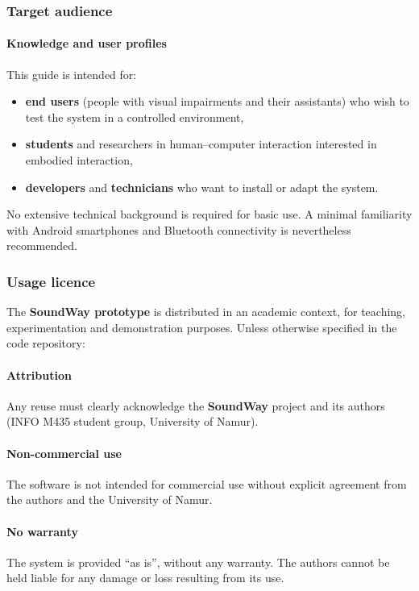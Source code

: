 \documentclass[12pt,a4paper]{article}
\begin{document}
\subsubsection{Target audience}

\paragraph{Knowledge and user profiles}

This guide is intended for:
\begin{itemize}
    \item \textbf{end users} (people with visual impairments and their assistants) who wish to test the system in a controlled environment,
    \item \textbf{students} and researchers in human–computer interaction interested in embodied interaction,
    \item \textbf{developers} and \textbf{technicians} who want to install or adapt the system.
\end{itemize}

No extensive technical background is required for basic use. A minimal familiarity with Android smartphones and Bluetooth connectivity is nevertheless recommended.

\subsubsection{Usage licence}

The \textbf{SoundWay prototype} is distributed in an academic context, for teaching, experimentation and demonstration purposes. Unless otherwise specified in the code repository:

\paragraph{Attribution}
Any reuse must clearly acknowledge the \textbf{SoundWay} project and its authors (INFO M435 student group, University of Namur).

\paragraph{Non-commercial use}
The software is not intended for commercial use without explicit agreement from the authors and the University of Namur.

\paragraph{No warranty}
The system is provided “as is”, without any warranty. The authors cannot be held liable for any damage or loss resulting from its use.
\end{document}
